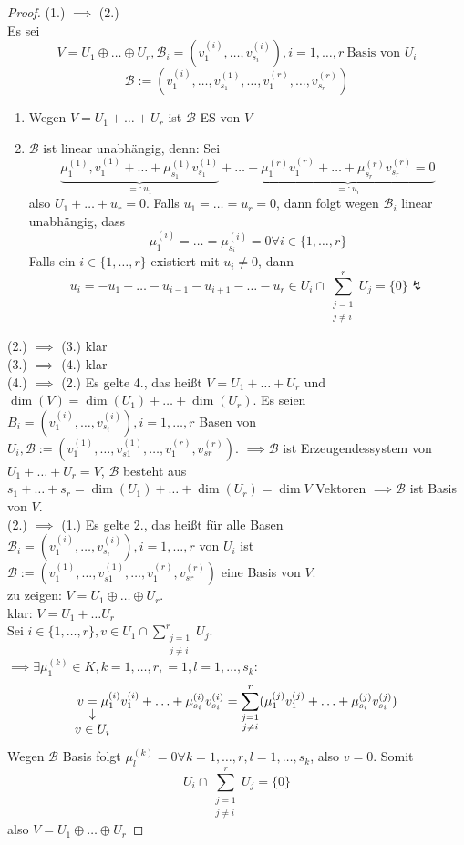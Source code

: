 \documentclass[a4paper]{scrartcl}
\DeclareMathOperator{\Exists}{\exists}
\DeclareMathOperator{\Forall}{\forall}
\theoremstyle{definition}
\theoremstyle{plain}
\theoremstyle{plain}
\theoremstyle{remark}
\theoremstyle{remark}
\theoremstyle{remark}
\theoremstyle{remark}
\theoremstyle{remark}
\begin{document}
\begin{proof}
(1.) $\implies$ (2.) \\
  Es sei
\[V = U_1 \oplus \ldots \oplus U_r, \mathcal{B}_i = (v_1^{(i)}, \ldots, v_{s_i}^{(i)}), i = 1,\ldots, r~\text{Basis von $U_i$}\]
\[\mathcal{B}:= (v_1^{(i)}, \ldots, v_{s_1}^{(1)}, \ldots, v_1^{(r)}, \ldots, v_{s_r}^{(r)})\]
\begin{enumerate}
\item Wegen $V = U_1 + \ldots + U_r$ ist $\mathcal{B}$ ES von $V$
\item $\mathcal{B}$ ist linear unabhängig, denn: Sei
\[\underbrace{\mu_1^{(1)}, v_1^{(1)} + \ldots + \mu_{s_1}^{(1)} v_{s_1}^{(1)}}_{=: u_1} + \ldots + \underbrace{\mu_1^{(r)} v_1^{(r)} + \ldots + \mu_{s_r}^{(r)} v_{s_r}^{(r)} = 0}_{=: u_r}\]
also $U_1 + \ldots + u_r = 0$. Falls $u_1 = \ldots = u_r = 0$, dann folgt wegen $\mathcal{B}_i$ linear unabhängig, dass
\[\mu_1^{(i)} = \ldots = \mu_{s_i}^{(i)} = 0 \Forall i\in \{1, \ldots, r\}\]
Falls ein $i\in \{1, \ldots, r\}$ existiert mit $u_i \neq 0$, dann
\[u_i = -u_1 - \ldots - u_{i - 1} - u_{i + 1} - \ldots - u_r \in U_i \cap \sum_{\substack{j = 1 \\ j\neq i}}^{r} U_j = \{0\}\lightning\]
\end{enumerate}
(2.) $\implies$ (3.) klar \\
  (3.) $\implies$ (4.) klar \\
  (4.) $\implies$ (2.) Es gelte 4., das heißt $V = U_1 + \ldots + U_r$ und $\dim(V) = \dim(U_1) + \ldots + \dim(U_r)$. Es seien
       $B_i = (v_1^{(i)}, \ldots, v_{s_i}^{(i)}), i = 1, \ldots, r$ Basen von $U_i, \mathcal{B}:=(v_1^{(1)}, \ldots, v_{s1}^{(1)}, \ldots, v_{1}^{(r)}, v_{sr}^{(r)})$.
       $\implies \mathcal{B}$ ist Erzeugendessystem von $U_1 + \ldots + U_r = V$, $\mathcal{B}$ besteht aus $s_1 + \ldots + s_r = \dim(U_1) + \ldots + \dim(U_r) = \dim V$ Vektoren
       $\implies \mathcal{B}$ ist Basis von $V$. \\
  (2.) $\implies$ (1.) Es gelte 2., das heißt für alle Basen $\mathcal{B}_i = (v_1^{(i)}, \ldots, v_{s_i}^{(i)}), i = 1, \ldots, r$ von $U_i$ ist $\mathcal{B}:=(v_1^{(1)}, \ldots, v_{s1}^{(1)}, \ldots, v_{1}^{(r)}, v_{sr}^{(r)})$
eine Basis von $V$. \\
  zu zeigen: $V = U_1 \oplus \ldots \oplus U_r$. \\
  klar: $V = U_1 + \ldots U_r$ \\
  Sei $i \in \{1, \ldots, r\}, v \in U_1 \cap \sum_{\substack{j = 1 \\ j \neq i}}^{r} U_j$. $\implies \Exists \mu_1^{(k)} \in K, k = 1,\ldots, r, = 1, l = 1, \ldots, s_k:$
\[v \underarrow[=]{$v\in U_i$} \mu_1^{(i)} v_1^{(i)} + \ldots + \mu_{s_i}^{(i)} v_{s_i}^{(i)} = \sum_{\substack{j = 1 \\ j \neq i}}^{r} (\mu_1^{(j)} v_1^{(j)} + \ldots + \mu_{s_i}^{(j)} v_{s_i}^{(j)})\]
Wegen $\mathcal{B}$ Basis folgt $\mu_{l}^(k) = 0 \Forall k = 1, \ldots, r, l = 1,\ldots,s_k$, also $v = 0$. Somit
\[U_i \cap \sum_{\substack{j = 1 \\ j\neq i}}^{r} U_j = \{0\}\]
also $V = U_1 \oplus \ldots \oplus U_r$
\end{proof}
\end{document}
